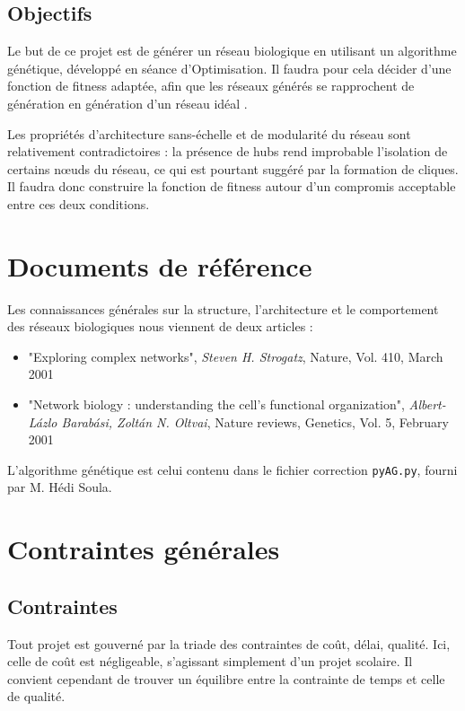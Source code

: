 \subsection{Objectifs}
Le but de ce projet est de générer un réseau biologique en utilisant un algorithme génétique, développé en séance d'Optimisation. Il faudra pour cela décider d'une fonction de fitness adaptée, afin que les réseaux générés se rapprochent de génération en génération d'un réseau \og idéal \fg .

Les propriétés d'architecture \og sans-échelle \fg{} et de modularité du réseau sont relativement contradictoires : la présence de hubs rend improbable l'isolation de certains n\oe{}uds du réseau, ce qui est pourtant suggéré par la formation de cliques. Il faudra donc construire la fonction de fitness autour d'un compromis acceptable entre ces deux conditions.

\section{Documents de référence}
Les connaissances générales sur la structure, l'architecture et le comportement des réseaux biologiques nous viennent de deux articles :

\begin{itemize}
	\item "Exploring complex networks", \textit{Steven H. Strogatz}, Nature, Vol. 410, March 2001
	\item "Network biology : understanding the cell's functional organization", \textit{Albert-L\'{a}zlo Barab\'{a}si, Zolt\'{a}n N. Oltvai}, Nature reviews, Genetics, Vol. 5, February 2001\medskip
\end{itemize}

L'algorithme génétique est celui contenu dans le fichier correction \texttt{pyAG.py}, fourni par M. Hédi Soula.

\section{Contraintes générales}

\subsection{Contraintes}
Tout projet est gouverné par la triade des contraintes de coût, délai, qualité. Ici, celle de coût est négligeable, s'agissant simplement d'un projet scolaire. Il convient cependant de trouver un équilibre entre la contrainte de temps et celle de qualité.

